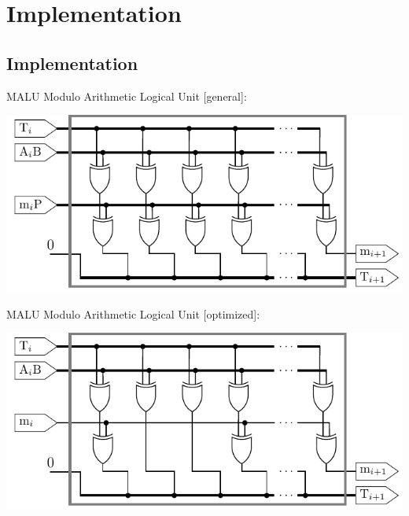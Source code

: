 \documentclass{beamer}
\begin{document}
\section{Implementation}
\subsection*{Implementation}
\begin{frame}{MALU}
	Modulo Arithmetic Logical Unit [general]:\\[3mm]
	\begin{center}
		\includegraphics[height=0.5\paperheight]{images/malu-core-basic}
	\end{center}
\end{frame}

\begin{frame}{MALU}
	Modulo Arithmetic Logical Unit [optimized]:\\[3mm]
	\begin{center}
		\includegraphics[height=0.5\paperheight]{images/malu-core-optimized}
	\end{center}
\end{frame}
\end{document}
